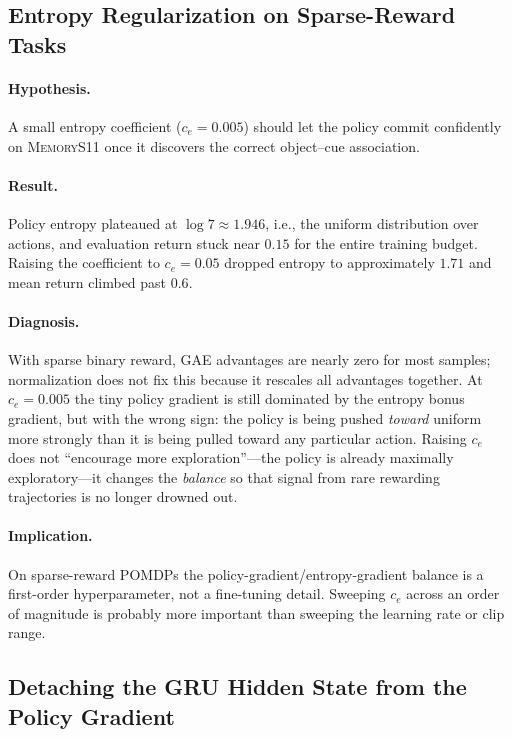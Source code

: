 \documentclass[letterpaper]{article}
\begin{document}
\subsection{Entropy Regularization on Sparse-Reward Tasks}

\paragraph{Hypothesis.} A small entropy coefficient ($c_e\!=\!0.005$)
should let the policy commit confidently on \textsc{MemoryS11} once it
discovers the correct object--cue association.

\paragraph{Result.} Policy entropy plateaued at $\log 7 \approx 1.946$, i.e.,
the uniform distribution over actions, and evaluation return stuck near
$0.15$ for the entire training budget. Raising the coefficient to
$c_e\!=\!0.05$ dropped entropy to approximately $1.71$ and mean return
climbed past $0.6$.

\paragraph{Diagnosis.} With sparse binary reward, GAE advantages are
nearly zero for most samples; normalization does not fix this because it
rescales all advantages together. At $c_e\!=\!0.005$ the tiny policy
gradient is still dominated by the entropy bonus gradient, but with the
wrong sign: the policy is being pushed \emph{toward} uniform more strongly
than it is being pulled toward any particular action. Raising $c_e$ does
not ``encourage more exploration''---the policy is already maximally
exploratory---it changes the \emph{balance} so that signal from rare
rewarding trajectories is no longer drowned out.

\paragraph{Implication.} On sparse-reward POMDPs the
policy-gradient/entropy-gradient balance is a first-order hyperparameter,
not a fine-tuning detail. Sweeping $c_e$ across an order of magnitude is
probably more important than sweeping the learning rate or clip range.

\subsection{Detaching the GRU Hidden State from the Policy Gradient}
\end{document}
